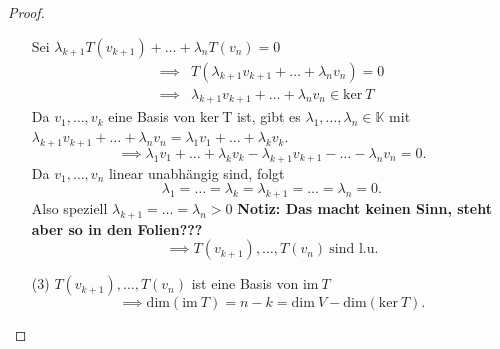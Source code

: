 \begin{proof}
\begin{enumerate}
        Sei $\lambda_{k+1}T(v_{k+1}) + \dots + \lambda_n T(v_n) = 0$
        \begin{align*}
            \implies &T(\lambda_{k+1}v_{k+1}+\dots +\lambda_nv_n) = 0\\
            \implies &\lambda_{k+1}v_{k+1} + \dots + \lambda_n v_n \in \mathrm{ker}\ T
        \end{align*}
        Da $v_1,\dots,v_k$ eine Basis von $\mathrm{ker}\ $T ist, gibt es 
        $\lambda_1,\dots,\lambda_n\in \mathbb{K}$ mit\\
        $\lambda_{k+1}v_{k+1} + \dots + \lambda_nv_n = \lambda_1 v_1 + \dots + \lambda_k v_k$.
        \[
            \implies \lambda_1v_1 + \dots + \lambda_kv_k - \lambda_{k+1}v_{k+1} - \dots - \lambda_n v_n = 0    
        .\]
        Da $v_1,\dots,v_n$ linear unabhängig sind, folgt
        \[
            \lambda_1 = \dots = \lambda_k = \lambda_{k+1} = \dots = \lambda_n = 0   
        .\]
        Also speziell $\lambda_{k+1} = \dots = \lambda_n > 0$ \textbf{Notiz: Das macht keinen Sinn, steht
        aber so in den Folien???}
        \[
            \implies T(v_{k+1}),\dots,T(v_n)\ \text{sind l.u.}
        \]
        \item[(3)] $T(v_{k+1}),\dots,T(v_n)$ ist eine Basis von $\mathrm{im}\ T$
        \[
            \implies \mathrm{dim}(\mathrm{im}\ T) = n-k = \mathrm{dim}\ V - \mathrm{dim}(\mathrm{ker}\ T)    
        .\]
    \end{enumerate} 
\end{proof}
